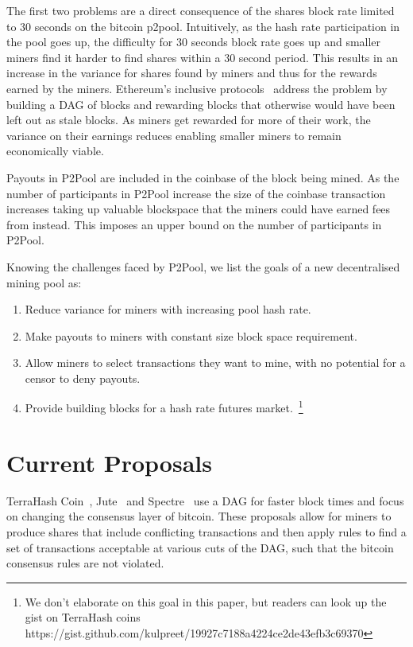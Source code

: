 \documentclass{article}
\begin{document}
The first two problems are a direct consequence of the shares block
rate limited to 30 seconds on the bitcoin p2pool. Intuitively, as the
hash rate participation in the pool goes up, the difficulty for 30
seconds block rate goes up and smaller miners find it harder to find
shares within a 30 second period. This results in an increase in the
variance for shares found by miners and thus for the rewards earned by
the miners. Ethereum's inclusive protocols~\cite{inclusive-protocols}
address the problem by building a DAG of blocks and rewarding blocks
that otherwise would have been left out as stale blocks. As miners get
rewarded for more of their work, the variance on their earnings
reduces enabling smaller miners to remain economically viable.

Payouts in P2Pool are included in the coinbase of the block being
mined. As the number of participants in P2Pool increase the size of
the coinbase transaction increases taking up valuable blockspace that
the miners could have earned fees from instead. This imposes an
upper bound on the number of participants in P2Pool.

Knowing the challenges faced by P2Pool, we list the goals of a new
decentralised mining pool as:

\begin{enumerate}
\item Reduce variance for miners with increasing pool hash rate.
\item Make payouts to miners with constant size block space
  requirement.
\item Allow miners to select transactions they want to mine, with no
  potential for a censor to deny payouts.
\item Provide building blocks for a hash rate futures
  market.~\footnote{We don't elaborate on this goal in this paper, but
    readers can look up the gist on TerraHash coins
    https://gist.github.com/kulpreet/19927c7188a4224ce2de43efb3c69370}
\end{enumerate}

\section{Current Proposals}

TerraHash Coin~\cite{mcelrath:variance}, Jute~\cite{jute} and
Spectre~\cite{spectre} use a DAG for faster block times and focus on
changing the consensus layer of bitcoin. These proposals allow for
miners to produce shares that include conflicting transactions and
then apply rules to find a set of transactions acceptable at various
cuts of the DAG, such that the bitcoin consensus rules are not
violated.
\end{document}

